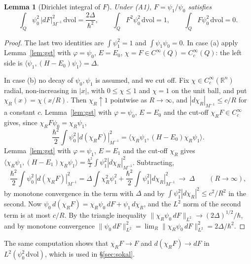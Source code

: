 \documentclass[11pt,a4paper]{article}
\newtheorem{lemma}[theorem]{Lemma}
\theoremstyle{definition}
\theoremstyle{remark}
\newcommand{\R}{\mathbb{R}}
\newcommand{\dvol}{\,\mathrm{dvol}}
\begin{document}
\begin{lemma}[Dirichlet integral of $F$]\label{lem:cutoff}
Under (A1), $F=\psi_1/\psi_0$ satisfies
\[
  \int_Q\psi_0^2\,|dF|^2_{M^{-1}}\dvol=\frac{2\Delta}{\hbar^2},\qquad \int_Q F^2\psi_0^2\dvol=1,\qquad \int_Q F\psi_0^2\dvol=0 .
\]
\end{lemma}

\begin{proof}
The last two identities are $\int\psi_1^2=1$ and $\int\psi_1\psi_0=0$.
In case (a) apply Lemma~\ref{lem:gst} with $\varphi=\psi_0$, $E=E_0$, $\chi=F\in C^\infty(Q)=C_c^\infty(Q)$: the left side is $\langle\psi_1,(H-E_0)\psi_1\rangle=\Delta$.

In case (b) no decay of $\psi_0,\psi_1$ is assumed, and we cut off.
Fix $\chi\in C_c^\infty(\R^n)$ radial, non-increasing in $|x|$, with $0\le\chi\le1$ and $\chi=1$ on the unit ball, and put $\chi_R(x)=\chi(x/R)$.
Then $\chi_R\uparrow1$ pointwise as $R\to\infty$, and $|d\chi_R|_{M^{-1}}\le c/R$ for a constant $c$.
Lemma~\ref{lem:gst} with $\varphi=\psi_0$, $E=E_0$ and the cut-off $\chi_RF\in C_c^\infty$ gives, since $\chi_RF\psi_0=\chi_R\psi_1$,
\[
  \frac{\hbar^2}{2}\int\psi_0^2\,|d(\chi_RF)|^2_{M^{-1}}=\bigl\langle\chi_R\psi_1,(H-E_0)\chi_R\psi_1\bigr\rangle .
\]
Lemma~\ref{lem:gst} with $\varphi=\psi_1$, $E=E_1$ and the cut-off $\chi_R$ gives $\langle\chi_R\psi_1,(H-E_1)\chi_R\psi_1\rangle=\tfrac{\hbar^2}{2}\int\psi_1^2|d\chi_R|^2_{M^{-1}}$.
Subtracting,
\[
  \frac{\hbar^2}{2}\int\psi_0^2\,|d(\chi_RF)|^2_{M^{-1}}=\Delta\int\chi_R^2\psi_1^2+\frac{\hbar^2}{2}\int\psi_1^2|d\chi_R|^2_{M^{-1}}\ \longrightarrow\ \Delta\qquad(R\to\infty),
\]
by monotone convergence in the term with $\Delta$ and by $\int\psi_1^2|d\chi_R|^2\le c^2/R^2$ in the second.
Now $\psi_0\,d(\chi_RF)=\chi_R\psi_0\,dF+\psi_1\,d\chi_R$, and the $L^2$ norm of the second term is at most $c/R$.
By the triangle inequality $\|\chi_R\psi_0\,dF\|_{L^2}\to(2\Delta)^{1/2}/\hbar$, and by monotone convergence $\|\psi_0\,dF\|_{L^2}^2=\lim_R\|\chi_R\psi_0\,dF\|_{L^2}^2=2\Delta/\hbar^2$.
\end{proof}

The same computation shows that $\chi_RF\to F$ and $d(\chi_RF)\to dF$ in $L^2(\psi_0^2\dvol)$, which is used in \S\ref{sec:sokal}.
\end{document}
